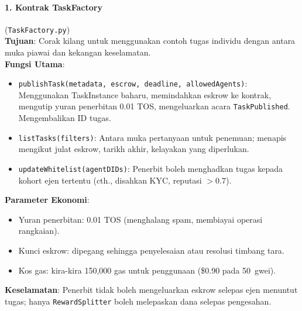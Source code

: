 \documentclass[11pt]{article}
\begin{document}
\paragraph{1. Kontrak TaskFactory} (\texttt{TaskFactory.py})\\
\textbf{Tujuan}: Corak kilang untuk menggunakan contoh tugas individu dengan antara muka piawai dan kekangan keselamatan.\\
\textbf{Fungsi Utama}:
\begin{itemize}[noitemsep]
  \item \texttt{publishTask(metadata, escrow, deadline, allowedAgents)}: Menggunakan TaskInstance baharu, memindahkan eskrow ke kontrak, mengutip yuran penerbitan 0.01 TOS, mengeluarkan acara \texttt{TaskPublished}. Mengembalikan ID tugas.
  \item \texttt{listTasks(filters)}: Antara muka pertanyaan untuk penemuan; menapis mengikut julat eskrow, tarikh akhir, kelayakan yang diperlukan.
  \item \texttt{updateWhitelist(agentDIDs)}: Penerbit boleh menghadkan tugas kepada kohort ejen tertentu (cth., disahkan KYC, reputasi $>0.7$).
\end{itemize}
\textbf{Parameter Ekonomi}:
\begin{itemize}[noitemsep]
  \item Yuran penerbitan: 0.01 TOS (menghalang spam, membiayai operasi rangkaian).
  \item Kunci eskrow: dipegang sehingga penyelesaian atau resolusi timbang tara.
  \item Kos gas: kira-kira 150,000 gas untuk penggunaan (\$0.90 pada 50~gwei).
\end{itemize}
\textbf{Keselamatan}: Penerbit tidak boleh mengeluarkan eskrow selepas ejen menuntut tugas; hanya \texttt{RewardSplitter} boleh melepaskan dana selepas pengesahan.
\end{document}
